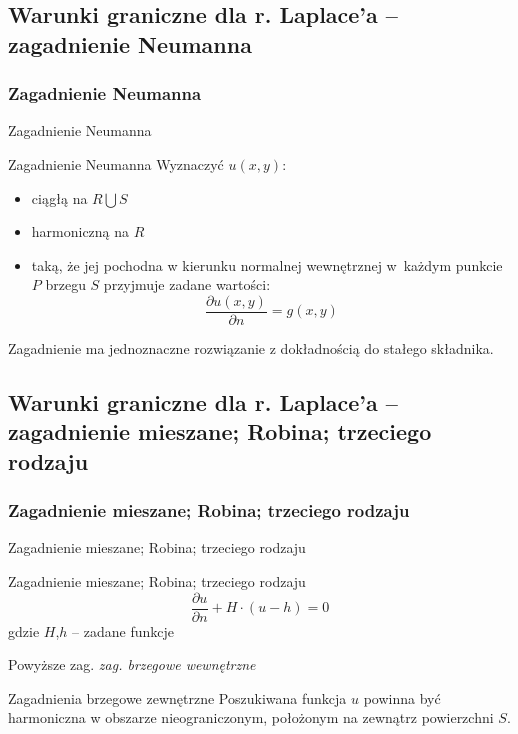 \subsection*{Warunki graniczne dla r. Laplace'a -- zagadnienie Neumanna}
\subsubsection{Zagadnienie Neumanna}

\begin{frame}{Zagadnienie Neumanna}
  \begin{block}{Zagadnienie Neumanna}
    Wyznaczyć $u(x,y)$:
    \begin{itemize}
      \item ciągłą na $R \bigcup S$
      \item harmoniczną na $R$
      \item taką, że jej pochodna w kierunku normalnej wewnętrznej w~każdym punkcie $P$ brzegu $S$ przyjmuje zadane wartości:
      $$\frac{{\partial}u(x,y)}{{\partial}n} = g(x,y)$$
    \end{itemize}
  \end{block}
  Zagadnienie ma jednoznaczne rozwiązanie z dokładnością do stałego składnika.
\end{frame}

\subsection*{Warunki graniczne dla r. Laplace'a -- zagadnienie mieszane; Robina; trzeciego rodzaju}
\subsubsection{Zagadnienie mieszane; Robina; trzeciego rodzaju}

\begin{frame}{Zagadnienie mieszane; Robina; trzeciego rodzaju}
  \begin{block}{Zagadnienie mieszane; Robina; trzeciego rodzaju}
    $$\frac{{\partial}u}{{\partial}n} + H \cdot (u - h) = 0$$
    gdzie $H$,$h$ -- zadane funkcje
  \end{block}
  Powyższe zag. \textit{zag. brzegowe wewnętrzne} %
\end{frame}

\begin{frame}
  \begin{block}{Zagadnienia brzegowe zewnętrzne}
    Poszukiwana funkcja $u$ powinna być harmoniczna w obszarze nieograniczonym, położonym na zewnątrz powierzchni $S$.
  \end{block}
\end{frame}


